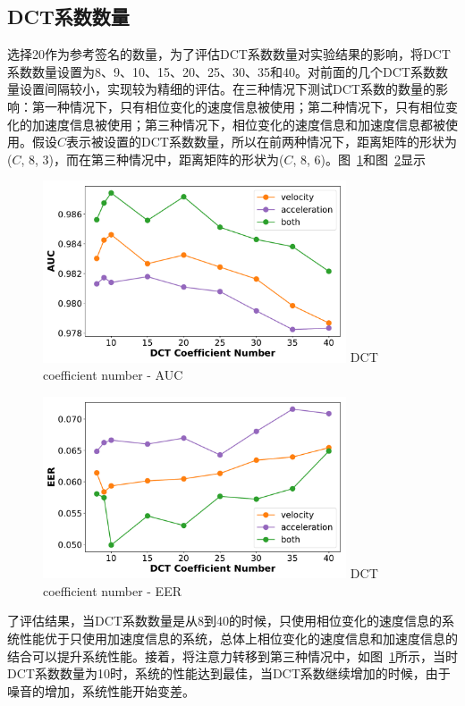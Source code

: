 \subsection{DCT系数数量}
选择20作为参考签名的数量，为了评估DCT系数数量对实验结果的影响，将DCT系数数量设置为8、9、10、15、20、25、30、35和40。对前面的几个DCT系数数量设置间隔较小，实现较为精细的评估。在三种情况下测试DCT系数的数量的影响：第一种情况下，只有相位变化的速度信息被使用；第二种情况下，只有相位变化的加速度信息被使用；第三种情况下，相位变化的速度信息和加速度信息都被使用。假设$C$表示被设置的DCT系数数量，所以在前两种情况下，距离矩阵的形状为($C$, 8, 3)，而在第三种情况中，距离矩阵的形状为($C$, 8, 6)。图~\ref{fig:dct-total-auc}和图~\ref{fig:dct-total-eer}显示
\begin{figure}
  \centering
  \includegraphics[width=0.8\textwidth]{figure/dct_total_auc.pdf}
      {DCT coefficient number - AUC}
  \label{fig:dct-total-auc}
\end{figure}
\begin{figure}
  \centering
  \includegraphics[width=0.8\textwidth]{figure/dct_total_eer.pdf}
      {DCT coefficient number - EER}
  \label{fig:dct-total-eer}
\end{figure}
了评估结果，当DCT系数数量是从8到40的时候，只使用相位变化的速度信息的系统性能优于只使用加速度信息的系统，总体上相位变化的速度信息和加速度信息的结合可以提升系统性能。接着，将注意力转移到第三种情况中，如图~\ref{fig:dct-total-auc}所示，当时DCT系数数量为10时，系统的性能达到最佳，当DCT系数继续增加的时候，由于噪音的增加，系统性能开始变差。

